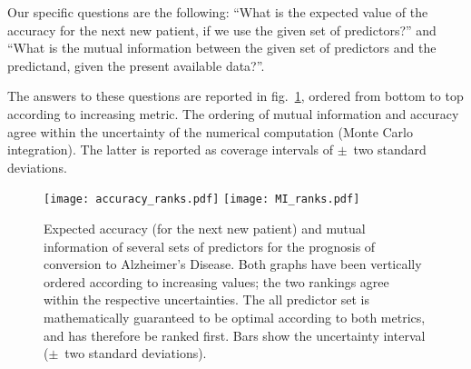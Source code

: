 \documentclass[utf8]{FrontiersinHarvard} %
\newcommand*{\fig}{fig.}%
\renewcommand*{\|}[1][]{\nonscript\:#1\vert\nonscript\:\mathopen{}}
\newcommand*{\ad}{Alzheimer's Disease}
\begin{document}
Our specific questions are the following: \enquote{What is the expected value of the accuracy for the next new patient, if we use the given set of predictors?} and \enquote{What is the mutual information between the given set of predictors and the predictand, given the present available data?}.

The answers to these questions are reported in \fig~\ref{fig:mutual_info}, ordered from bottom to top according to increasing metric. The ordering of mutual information and accuracy agree within the uncertainty of the numerical computation (Monte Carlo integration). The latter is reported as coverage intervals of $\pm$~two standard deviations.
\begin{figure}[!t]%
  \centering%
\texttt{[image: accuracy\_ranks.pdf]}%
\hfill%
\texttt{[image: MI\_ranks.pdf]}%
\caption{Expected accuracy (for the next new patient) and mutual information of several sets of predictors for the prognosis of conversion to \ad. Both graphs have been vertically ordered according to increasing values; the two rankings agree within the respective uncertainties. The \textsf{all} predictor set is mathematically guaranteed to be optimal according to both metrics, and has therefore be ranked first. Bars show the uncertainty interval ($\pm$~two standard deviations).}\label{fig:mutual_info}
\end{figure}%
\end{document}
